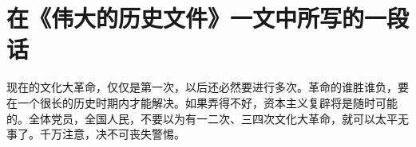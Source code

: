 \section[在《伟大的历史文件》一文中所写的一段话（一九六七年五月十八日）]{在《伟大的历史文件》一文中所写的一段话}


现在的文化大革命，仅仅是第一次，以后还必然要进行多次。革命的谁胜谁负，要在一个很长的历史时期内才能解决。如果弄得不好，资本主义复辟将是随时可能的。全体党员，全国人民，不要以为有一二次、三四次文化大革命，就可以太平无事了。千万注意，决不可丧失警惕。


